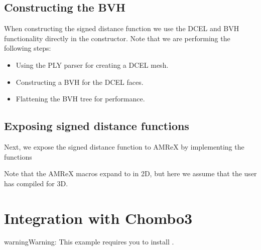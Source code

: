\documentclass[letterpaper,10pt,english]{sphinxmanual}
\begin{document}
\subsection{Constructing the BVH}
\label{\detokenize{Example_AMReX:constructing-the-bvh}}
\sphinxAtStartPar
When constructing the signed distance function we use the DCEL and BVH functionality directly in the constructor.
Note that we are performing the following steps:
\begin{itemize}
\item {} 
\sphinxAtStartPar
Using the PLY parser for creating a DCEL mesh.

\item {} 
\sphinxAtStartPar
Constructing a BVH for the DCEL faces.

\item {} 
\sphinxAtStartPar
Flattening the BVH tree for performance.

\end{itemize}


\subsection{Exposing signed distance functions}
\label{\detokenize{Example_AMReX:exposing-signed-distance-functions}}
\sphinxAtStartPar
Next, we expose the signed distance function to AMReX by implementing the functions

\begin{sphinxVerbatim}[commandchars=\\\{\}]
        
\end{sphinxVerbatim}

\sphinxAtStartPar
Note that the AMReX  macros expand to  in 2D, but here we assume that the user has compiled for 3D.

\sphinxstepscope


\section{Integration with Chombo3}
\label{\detokenize{Example_Chombo3:integration-with-chombo3}}\label{\detokenize{Example_Chombo3::doc}}
\begin{sphinxadmonition}{warning}{Warning:}
\sphinxAtStartPar
This example requires you to install .
\end{sphinxadmonition}
\end{document}

